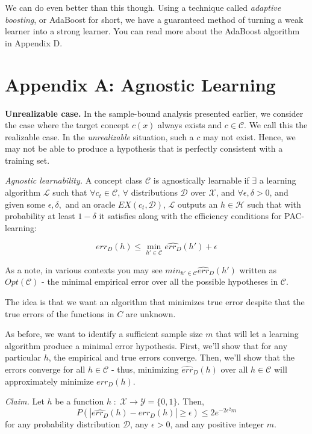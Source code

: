 \documentclass{article}
\begin{document}
We can do even better than this though. Using a technique called \emph{adaptive
boosting}, or AdaBoost for short, we have a guaranteed method of turning a weak
learner into a strong learner. You can read more about the AdaBoost algorithm
in Appendix D.

\appendix
\section{Appendix A: Agnostic Learning}
\textbf{Unrealizable case.} In the sample-bound analysis presented
earlier, we consider the case
where the target concept $c(x)$ always exists and $c \in \mathcal{C}$.
We call this the realizable case. In the \emph{unrealizable} situation,
such a $c$ may not exist. Hence, we may not be able to produce a
hypothesis that is perfectly consistent with a training set.

\emph{Agnostic learnability.} A concept class $\mathcal{C}$ is
agnostically learnable if $\exists$ a learning algorithm $\mathcal{L}$
such that $\forall c_t \in \mathcal{C}$, $\forall$ distributions
$\mathcal{D}$ over $\mathcal{X}$, and $\forall \epsilon, \delta > 0$,
and given some $\epsilon, \delta,$ and an oracle $EX(c_t, \mathcal{D})$,
$\mathcal{L}$ outputs an $h \in \mathcal{H}$ such that with probability
at least $1 - \delta$ it satisfies along with the efficiency conditions
for PAC-learning:

$$err_D(h) \leq \min_{h'\in \mathcal{C}} \hat{err_D}(h') + \epsilon$$

As a note, in various contexts you may see $min_{h' \in \mathcal{C}}
\hat{err}_D(h')$ written as $Opt(\mathcal{C})$ - the minimal empirical
error over all the possible hypotheses in $\mathcal{C}$.

The idea is that we want an algorithm that minimizes true error despite
that the true errors of the functions in $C$ are unknown.

As before, we want to identify a sufficient sample size $m$ that will
let a learning algorithm produce a minimal error hypothesis. First,
we'll show that for any particular $h$, the empirical and true errors
converge. Then, we'll show that the errors converge for all $h \in
\mathcal{C}$ - thus, minimizing $\hat{err}_D(h)$ over all $h \in
\mathcal{C}$ will approximately minimize $err_D(h)$.

\emph{Claim.} Let $h$ be a function $h\;:\;\mathcal{X}\rightarrow
\mathcal{Y} = \{0,1\}$. Then, $$P(|\hat{err_D}(h) - err_D(h)| \geq
\epsilon) \leq 2e^{-2\epsilon^2 m}$$ for any probability distribution
$\mathcal{D}$, any $\epsilon >0$, and any positive integer $m$.
\end{document}
